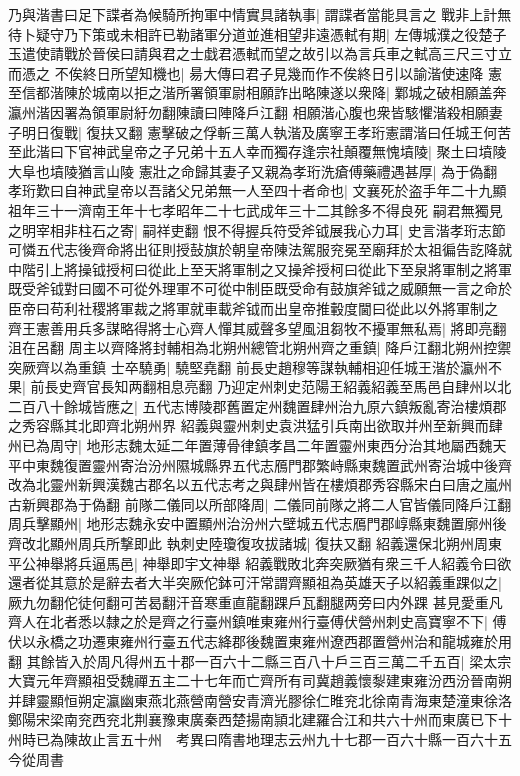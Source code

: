 乃與湝書曰足下諜者為候騎所拘軍中情實具諸執事|{
	謂諜者當能具言之}
戰非上計無待卜疑守乃下策或未相許已勒諸軍分道並進相望非遠憑軾有期|{
	左傳城濮之役楚子玉遣使請戰於晉侯曰請與君之士戱君憑軾而望之故引以為言兵車之軾高三尺三寸立而憑之}
不俟終日所望知機也|{
	昜大傳曰君子見幾而作不俟終日引以諭湝使速降}
憲至信都湝陳於城南以拒之湝所署領軍尉相願詐出略陳遂以衆降|{
	鄴城之破相願盖奔瀛州湝因署為領軍尉紆勿翻陳讀曰陣降戶江翻}
相願湝心腹也衆皆駭懼湝殺相願妻子明日復戰|{
	復扶又翻}
憲擊破之俘斬三萬人執湝及廣寧王孝珩憲謂湝曰任城王何苦至此湝曰下官神武皇帝之子兄弟十五人幸而獨存逢宗社顛覆無愧墳陵|{
	聚土曰墳陵大阜也墳陵猶言山陵}
憲壯之命歸其妻子又親為孝珩洗瘡傅藥禮遇甚厚|{
	為于偽翻}
孝珩歎曰自神武皇帝以吾諸父兄弟無一人至四十者命也|{
	文襄死於盗手年二十九顯祖年三十一濟南王年十七孝昭年二十七武成年三十二其餘多不得良死}
嗣君無獨見之明宰相非柱石之寄|{
	嗣祥吏翻}
恨不得握兵符受斧钺展我心力耳|{
	史言湝孝珩志節可憐五代志後齊命將出征則授鼔旗於朝皇帝陳法駕服兖冕至廟拜於太祖徧告訖降就中階引上將操钺授柯曰從此上至天將軍制之又操斧授柯曰從此下至泉將軍制之將軍既受斧钺對曰國不可從外理軍不可從中制臣既受命有鼓旗斧钺之威願無一言之命於臣帝曰苟利社稷將軍裁之將軍就車載斧钺而出皇帝推轂度閫曰從此以外將軍制之}
齊王憲善用兵多謀略得將士心齊人憚其威聲多望風沮芻牧不擾軍無私焉|{
	將即亮翻沮在呂翻}
周主以齊降將封輔相為北朔州總管北朔州齊之重鎮|{
	降戶江翻北朔州控禦突厥齊以為重鎮}
士卒驍勇|{
	驍堅堯翻}
前長史趙穆等謀執輔相迎任城王湝於瀛州不果|{
	前長史齊官長知两翻相息亮翻}
乃迎定州刺史范陽王紹義紹義至馬邑自肆州以北二百八十餘城皆應之|{
	五代志博陵郡舊置定州魏置肆州治九原六鎮叛亂寄治樓煩郡之秀容縣其北即齊北朔州界}
紹義與靈州刺史袁洪猛引兵南出欲取并州至新興而肆州已為周守|{
	地形志魏太延二年置薄骨律鎮孝昌二年置靈州東西分治其地屬西魏天平中東魏復置靈州寄治汾州隰城縣界五代志鴈門郡繁峙縣東魏置武州寄治城中後齊改為北靈州新興漢魏古郡名以五代志考之與肆州皆在樓煩郡秀容縣宋白曰唐之嵐州古新興郡為于偽翻}
前隊二儀同以所部降周|{
	二儀同前隊之將二人官皆儀同降戶江翻}
周兵擊顯州|{
	地形志魏永安中置顯州治汾州六壁城五代志鴈門郡崞縣東魏置廓州後齊改北顯州周兵所撃即此}
執刺史陸瓊復攻拔諸城|{
	復扶又翻}
紹義還保北朔州周東平公神舉將兵逼馬邑|{
	神舉即宇文神舉}
紹義戰敗北奔突厥猶有衆三千人紹義令曰欲還者從其意於是辭去者大半突厥佗鉢可汗常謂齊顯祖為英雄天子以紹義重踝似之|{
	厥九勿翻佗徒何翻可苦曷翻汗音寒重直龍翻踝戶瓦翻腿两旁曰内外踝}
甚見愛重凡齊人在北者悉以隸之於是齊之行臺州鎮唯東雍州行臺傅伏營州刺史高寶寧不下|{
	傅伏以永橋之功遷東雍州行臺五代志絳郡後魏置東雍州遼西郡置營州治和龍城雍於用翻}
其餘皆入於周凡得州五十郡一百六十二縣三百八十戶三百三萬二千五百|{
	梁太宗大寶元年齊顯祖受魏禪五主二十七年而亡齊所有司冀趙義懷㴝建東雍汾西汾晉南朔并肆靈顯恒朔定瀛幽東燕北燕營南營安青濟光膠徐仁睢兖北徐南青海東楚潼東徐洛鄭陽宋梁南兖西兖北荆襄豫東廣秦西楚揚南頴北建羅合江和共六十州而東廣已下十州時已為陳故止言五十州　考異曰隋書地理志云州九十七郡一百六十縣一百六十五今從周書}

